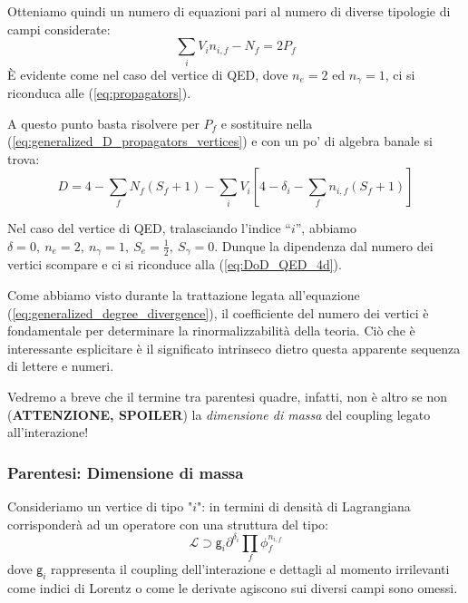 \documentclass[../main.tex]{subfiles}
\begin{document}
Otteniamo quindi un numero di equazioni pari al numero di diverse tipologie di campi considerate:
\begin{equation}
    \sum_i V_i n_{i,f} - N_f = 2P_f
    \label{eq:generalized_propagators}
\end{equation}
È evidente come nel caso del vertice di QED, dove $n_e = 2$ ed $n_\gamma=1$, ci si riconduca alle (\ref{eq:propagators}).

A questo punto basta risolvere per $P_f$ e sostituire nella (\ref{eq:generalized_D_propagators_vertices}) e con un po' di algebra banale si trova:
\begin{equation}
    D = 4 - \sum_f N_f(S_f+1) - \sum_i V_i [4-\delta_i-\sum_f n_{i,f}(S_f+1)]
    \label{eq:generalized_D_ext_vertices}
\end{equation}

\begin{nota}
    Nel caso del vertice di QED, tralasciando l'indice “$i$”, abbiamo $\delta=0, ~ n_e=2, ~ n_\gamma=1, ~ S_e=\frac{1}{2}, ~ S_\gamma=0$. Dunque la dipendenza dal numero dei vertici scompare e ci si riconduce alla (\ref{eq:DoD_QED_4d}).
    \label{note:qed_vertex_dependence}
\end{nota}


\begin{nota}
    Come abbiamo visto durante la trattazione legata all'equazione (\ref{eq:generalized_degree_divergence}), il coefficiente del numero dei vertici è fondamentale per determinare la rinormalizzabilità della teoria. Ciò che è interessante esplicitare è il significato intrinseco dietro questa apparente sequenza di lettere e numeri.

    Vedremo a breve che il termine tra parentesi quadre, infatti, non è altro se non (\textbf{ATTENZIONE, SPOILER}) la \textit{dimensione di massa} del coupling legato all'interazione!
    \label{note:coupling_mass_dim}
\end{nota}

\subsubsection{Parentesi: Dimensione di massa}
Consideriamo un vertice di tipo "$i$": in termini di densità di Lagrangiana corrisponderà ad un operatore con una struttura del tipo:
\begin{equation}
\mathscr{L} \supset \mathsf g_i\partial^{\delta_i}\prod_f\phi_f^{n_{i,f}}
\label{eq:lagr_vertex}
\end{equation}
dove $\mathsf g_i$ rappresenta il coupling dell'interazione e dettagli al momento irrilevanti come indici di Lorentz o come le derivate agiscono sui diversi campi sono omessi.
\end{document}
